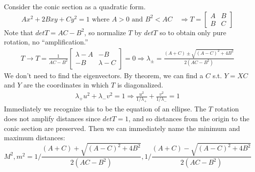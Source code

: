 \documentclass[twoside]{amsart}
\theoremstyle{plain}
\theoremstyle{definition}
\newcommand{\exercisehead}[1]
  {
   \noindent{\small\bf Exercise #1.}
   \smallskip}
\begin{document}
\exercisehead{12} Consider the conic section as a quadratic form.  
\[
Ax^2 + 2Bxy + Cy^2 = 1 \text{ where } A > 0 \text{ and } B^2 < AC \quad \Longrightarrow T = \left[ \begin{matrix} A & B \\ B & C \end{matrix} \right]
\]
Note that $det{T} = AC - B^2$, so normalize $T$ by $det{T}$ so to obtain only pure rotation, no ``amplification.''  
\[
\begin{gathered}
  T \to T = \frac{1}{ AC - B^2} \left[ \begin{matrix}  \lambda -A & - B \\ -B & \lambda -C \end{matrix} \right] =0 \Longrightarrow \lambda_{\pm} = \frac{ (A+C) \pm \sqrt{ (A-C)^2 + 4B^2 } }{2 (AC-B^2) } 
\end{gathered}
\]
We don't need to find the eigenvectors.  By theorem, we can find a $C$ s.t. $Y=XC$ and $Y$ are the coordinates in which $T$ is diagonalized.  
\[
\begin{gathered}
\lambda_+ u^2 + \lambda_- v^2 = 1 \Longrightarrow \frac{ u^2}{ 1/\lambda_+ } + \frac{v^2}{ 1/\lambda_- } =1
\end{gathered}
\]
Immediately we recognize this to be the equation of an ellipse.  The $T$ rotation does not amplify distances since $det{T} =1$, and so distances from the origin to the conic section are preserved.  Then we can immediately name the minimum and maximum distances:
\[
M^2, m^2 = 1/ \frac{ (A+C) + \sqrt{ (A-C)^2 + 4B^2 } }{2 (AC-B^2) }, 1/\frac{ (A+C) - \sqrt{ (A-C)^2 + 4B^2 } }{2 (AC-B^2) }  
\]
\end{document}
